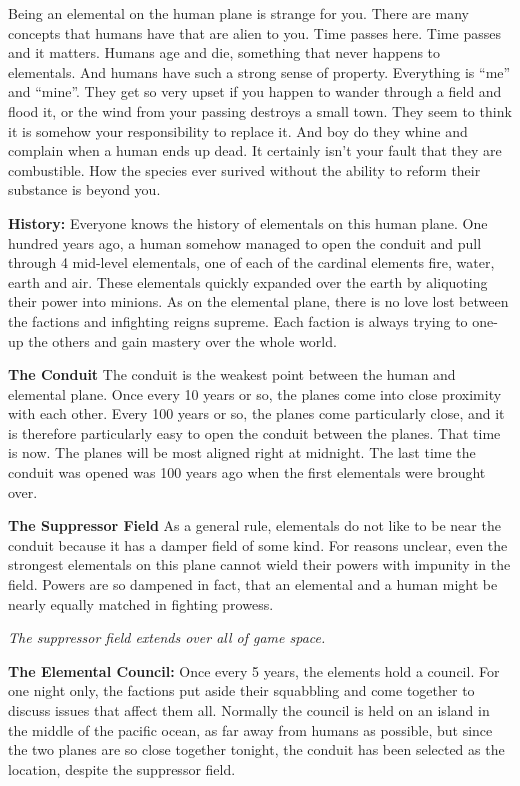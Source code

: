 \documentclass[blue]{elementals}
\begin{document}
\name{\bElemental{}}

Being an elemental on the human plane is strange for you. There are many concepts that humans have that are alien to you. Time passes here. Time passes and it matters. Humans age and die, something that never happens to elementals. And humans have such a strong sense of property. Everything is ``me'' and ``mine''.  They get so very upset if you happen to wander through a field and flood it, or the wind from your passing destroys a small town. They seem to think it is somehow your responsibility to replace it. And boy do they whine and complain when a human ends up dead. It certainly isn't your fault that they are combustible. How the species ever surived without the ability to reform their substance is beyond you.

{\bf History:}
Everyone knows the history of elementals on this human plane. One hundred years ago, a human somehow managed to open the conduit and pull through 4 mid-level elementals, one of each of the cardinal elements fire, water, earth and air. These elementals quickly expanded over the earth by aliquoting their power into minions. As on the elemental plane, there is no love lost between the factions and infighting reigns supreme. Each faction is always trying to one-up the others and gain mastery over the whole world.

{\bf The Conduit}
The conduit is the weakest point between the human and elemental plane. Once every 10 years or so, the planes come into close proximity with each other. Every 100 years or so, the planes come particularly close, and it is therefore particularly easy to open the conduit between the planes. That time is now. The planes will be most aligned right at midnight. The last time the conduit was opened was 100 years ago when the first elementals were brought over.

{\bf The Suppressor Field}
As a general rule, elementals do not like to be near the conduit because it has a damper field of some kind. For reasons unclear, even the strongest elementals on this plane cannot wield their powers with impunity in the field. Powers are so dampened in fact, that an elemental and a human might be nearly equally matched in fighting prowess.

\emph{The suppressor field extends over all of game space.}


{\bf The Elemental Council:}
Once every 5 years, the elements hold a council. For one night only, the factions put aside their squabbling and come together to discuss issues that affect them all. Normally the council is held on an island in the middle of the pacific ocean, as far away from humans as possible, but since the two planes are so close together tonight, the conduit has been selected as the location, despite the suppressor field.
\end{document}
